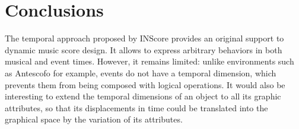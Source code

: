 \documentclass{article}
\begin{document}
\section{Conclusions}
The temporal approach proposed by INScore provides an original support to dynamic music score design. It allows to express arbitrary behaviors in both musical and event times.
However, it remains limited: unlike environments such as Antescofo for example, events do not have a temporal dimension, which prevents them from being composed with logical operations. It would also be interesting to extend the temporal dimensions of an object to all its graphic attributes, so that its displacements in time could be translated into the graphical space by the variation of its attributes.


\balance
%

\end{document}
